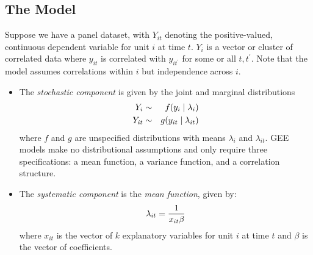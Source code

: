 \documentclass[letterpaper,10pt,english]{sphinxmanual}
\begin{document}
\subsection{The Model}
\label{vignette:the-model}
Suppose we have a panel dataset, with \(Y_{it}\) denoting the
positive-valued, continuous dependent variable for unit \(i\) at
time \(t\). \(Y_{i}\) is a vector or cluster of correlated data
where \(y_{it}\) is correlated with \(y_{it^\prime}\) for some
or all \(t, t^\prime\). Note that the model assumes correlations
within \(i\) but independence across \(i\).
\begin{itemize}
\item {} 
The \emph{stochastic component} is given by the joint and marginal
distributions
\begin{gather}
\begin{split}\begin{aligned}
Y_{i} &\sim& f(y_{i} \mid \lambda_{i})\\
Y_{it} &\sim& g(y_{it} \mid \lambda_{it})\end{aligned}\end{split}\notag
\end{gather}
where \(f\) and \(g\) are unspecified distributions with
means \(\lambda_{i}\) and \(\lambda_{it}\). GEE models make
no distributional assumptions and only require three specifications:
a mean function, a variance function, and a correlation structure.

\item {} 
The \emph{systematic component} is the \emph{mean function}, given by:
\begin{gather}
\begin{split}\lambda_{it} = \frac{1}{x_{it} \beta}\end{split}\notag
\end{gather}
where \(x_{it}\) is the vector of \(k\) explanatory variables
for unit \(i\) at time \(t\) and \(\beta\) is the vector
of coefficients.


\end{itemize}
\end{document}
